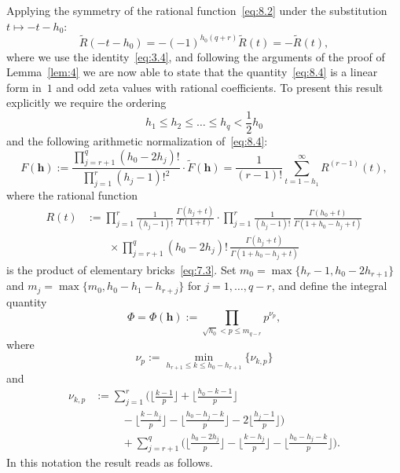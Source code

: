 \documentclass[a4paper,twoside]{article}
\numberwithin{equation}{section}
\renewcommand{\[}{\lfloor}
\renewcommand{\]}{\rfloor}
\newcommand{\<}{\langle}
\renewcommand{\>}{\rangle}
\newcommand{\wt}{\widetilde}
\newcommand{\bh}{\boldsymbol h}
\begin{document}
Applying the symmetry of the rational function~\eqref{eq:8.2}
under the substitution $t\mapsto-t-h_0$:
\begin{equation}
\wt R(-t-h_0)=-(-1)^{h_0(q+r)}\wt R(t)=-\wt R(t),
\label{eq:8.5}
\end{equation}
where we use the identity~\eqref{eq:3.4},
and following the arguments of the proof of Lemma~\ref{lem:4}
we are now able to state that the quantity~\eqref{eq:8.4}
is a linear form in~$1$ and odd zeta values
with rational coefficients.
To present this result explicitly we require the ordering
$$
h_1\le h_2\le\dots\le h_q<\frac12h_0
$$
and the following arithmetic normalization of~\eqref{eq:8.4}:
\begin{equation}
F(\bh)
:=\frac{\prod_{j=r+1}^q(h_0-2h_j)!}
{\prod_{j=1}^r(h_j-1)!^2}\cdot\wt F(\bh)
=\frac1{(r-1)!}\sum_{t=1-h_1}^\infty R^{(r-1)}(t),
\label{eq:8.6}
\end{equation}
where the rational function
\begin{equation}
\begin{split}
R(t)
&:=\prod_{j=1}^r\frac1{(h_j-1)!}\,
\frac{\Gamma(h_j+t)}{\Gamma(1+t)}
\cdot\prod_{j=1}^r\frac1{(h_j-1)!}\,
\frac{\Gamma(h_0+t)}{\Gamma(1+h_0-h_j+t)}
\\ &\qquad\times
\prod_{j=r+1}^q(h_0-2h_j)!\,
\frac{\Gamma(h_j+t)}{\Gamma(1+h_0-h_j+t)}
\end{split}
\label{eq:8.7}
\end{equation}
is the product of elementary bricks~\eqref{eq:7.3}.
Set $m_0=\max\{h_r-1,h_0-2h_{r+1}\}$
and $m_j=\max\{m_0,h_0-h_1-h_{r+j}\}$
for $j=1,\dots,q-r$,
and define the integral quantity
\begin{equation}
\Phi=\Phi(\bh):=\prod_{\sqrt{h_0}<p\le m_{q-r}}p^{\nu_p},
\label{eq:8.8}
\end{equation}
where
\begin{equation}
\nu_p
:=\min_{h_{r+1}\le k\le h_0-h_{r+1}}\{\nu_{k,p}\}
\label{eq:8.9}
\end{equation}
and
\begin{align*}
\nu_{k,p}
&:=\sum_{j=1}^r\biggl(\biggl\[\frac{k-1}p\biggr\]
+\biggl\[\frac{h_0-k-1}p\biggr\]
\\ &\phantom:\qquad
-\biggl\[\frac{k-h_j}p\biggr\]
-\biggl\[\frac{h_0-h_j-k}p\biggr\]
-2\biggl\[\frac{h_j-1}p\biggr\]\biggr)
\\ &\phantom:\qquad
+\sum_{j=r+1}^q\biggl(\biggl\[\frac{h_0-2h_j}p\biggr\]
-\biggl\[\frac{k-h_j}p\biggr\]
-\biggl\[\frac{h_0-h_j-k}p\biggr\]\biggr).
\end{align*}
In this notation the result reads as follows.
\end{document}
